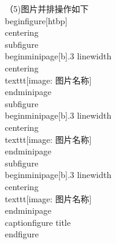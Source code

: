\documentclass[11pt]{article} %
\begin{document}
（5)图片并排操作如下
\\begin{figure}[htbp]
\\centering
\\subfigure
{
    \\begin{minipage}[b]{.3 linewidth}
        \\centering
        \\texttt{[image: 图片名称]}
    \\end{minipage}
}
\\subfigure
{
 	\\begin{minipage}[b]{.3 linewidth}
        \\centering
        \\texttt{[image: 图片名称]}
    \\end{minipage}
}
\\subfigure
{
 	\\begin{minipage}[b]{.3 linewidth}
        \\centering
        \\texttt{[image: 图片名称]}
    \\end{minipage}
}
\\caption{figure title}
\\end{figure}

                       
\end{document}

